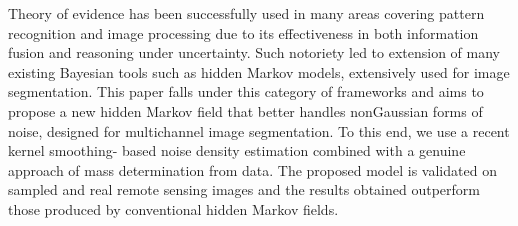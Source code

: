
Theory of evidence has been successfully used in many areas covering pattern recognition and image processing due to its effectiveness in both information fusion and reasoning under uncertainty. Such notoriety led to extension of many existing Bayesian tools such as hidden Markov models, extensively used for image segmentation.
This paper falls under this category of frameworks and aims to propose a new hidden Markov field that better handles nonGaussian forms of noise, designed for multichannel image segmentation. To this end, we use a recent kernel smoothing- based noise density estimation combined with a genuine approach of mass determination from data. The proposed model is validated on sampled and real remote sensing images and the results obtained outperform those produced by conventional hidden Markov fields.

